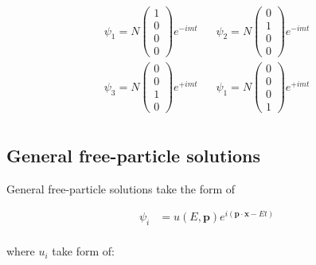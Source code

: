 \documentclass[10pt]{article}
\theoremstyle{definition}
\begin{document}
\begin{align*}
    \psi_1 = N\begin{pmatrix}
        1\\
        0\\
        0\\
        0
    \end{pmatrix} e^{-imt}
    \;\;\;&
    \psi_2 = N\begin{pmatrix}
        0\\
        1\\
        0\\
        0
    \end{pmatrix} e^{-imt}\\
    \psi_3 = N\begin{pmatrix}
        0\\
        0\\
        1\\
        0
    \end{pmatrix} e^{+imt}
    \;\;\;&
    \psi_1 = N\begin{pmatrix}
        0\\
        0\\
        0\\
        1
    \end{pmatrix} e^{+imt}\\
\end{align*}

\subsection*{General free-particle solutions}%

General free-particle solutions take the form of

\begin{align}
    \psi_i &= u(E,\mathbf{p})e^{i(\mathbf{p}\cdot\mathbf{x}-Et)}\\
\end{align}

where $u_i$ take form of:
\end{document}
